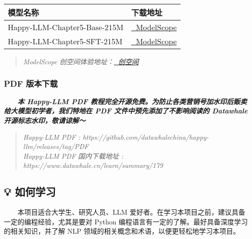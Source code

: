 \documentclass[12pt,a4paper]{book}
\begin{document}
\begin{longtable}[]{@{}
  >{\raggedright\arraybackslash}p{}
  >{\raggedright\arraybackslash}p{}@{}}
\toprule\noalign{}
\begin{minipage}[b]{\linewidth}\raggedright
模型名称
\end{minipage} & \begin{minipage}[b]{\linewidth}\raggedright
下载地址
\end{minipage} \\
\midrule\noalign{}
\endhead
\bottomrule\noalign{}
\endlastfoot
Happy-LLM-Chapter5-Base-215M &
\href{https://www.modelscope.cn/models/kmno4zx/happy-llm-215M-base}{🤖
ModelScope} \\
Happy-LLM-Chapter5-SFT-215M &
\href{https://www.modelscope.cn/models/kmno4zx/happy-llm-215M-sft}{🤖
ModelScope} \\
\end{longtable}

\begin{quote}
\emph{ModelScope
创空间体验地址：\href{https://www.modelscope.cn/studios/kmno4zx/happy_llm_215M_sft}{🤖
创空间}}
\end{quote}

\subsubsection{PDF 版本下载}\label{pdf-ux7248ux672cux4e0bux8f7d}

  \textbf{\emph{本 Happy-LLM PDF
教程完全开源免费。为防止各类营销号加水印后贩卖给大模型初学者，我们特地在
PDF 文件中预先添加了不影响阅读的 Datawhale 开源标志水印，敬请谅解～}}

\begin{quote}
\emph{Happy-LLM PDF :
https://github.com/datawhalechina/happy-llm/releases/tag/PDF}\\
\emph{Happy-LLM PDF 国内下载地址 :
https://www.datawhale.cn/learn/summary/179}
\end{quote}

\subsection{💡 如何学习}\label{ux5982ux4f55ux5b66ux4e60}

  本项目适合大学生、研究人员、LLM
爱好者。在学习本项目之前，建议具备一定的编程经验，尤其是要对 Python
编程语言有一定的了解。最好具备深度学习的相关知识，并了解 NLP
领域的相关概念和术语，以便更轻松地学习本项目。
\end{document}
